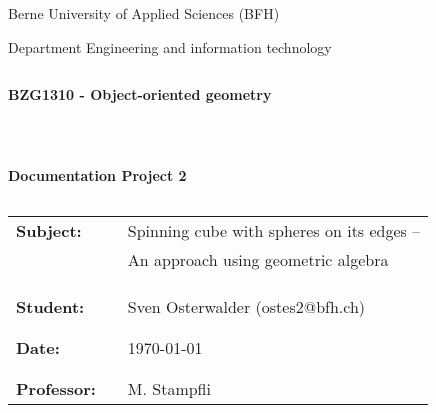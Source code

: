 \thispagestyle{empty}
\begin{center}
\Large{Berne University of Applied Sciences (BFH)}\\
\end{center}
 
 
\begin{center}
\Large{Department Engineering and information technology}
\end{center}
\begin{verbatim}
\end{verbatim}
\begin{center}
\textbf{\LARGE{BZG1310 -  Object-oriented geometry}}
\end{center}
\begin{verbatim}
 
 
\end{verbatim}
\begin{center}
\textbf{Documentation Project 2}
\end{center}
\begin{verbatim} 
\end{verbatim}
 
\begin{flushleft}
\begin{tabular}{lll}
\textbf{Subject:} & & Spinning cube with spheres on its edges --\\
& & An approach using geometric algebra\\
& & \\
& & \\
& & \\
\textbf{Student:} & & Sven Osterwalder (ostes2@bfh.ch)\\
& & \\
& & \\
\textbf{Date:} & & {\today}\\
& & \\
& & \\
\textbf{Professor:} & & M. Stampfli
\end{tabular}
\end{flushleft}